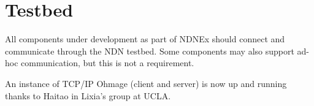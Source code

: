 \section{Testbed}

All components under development as part of NDNEx should connect and communicate through the NDN testbed. Some components may also support ad-hoc communication, but this is not a requirement. 

An instance of TCP/IP Ohmage (client and server) is now up and running thanks to Haitao in Lixia’s group at UCLA.  
